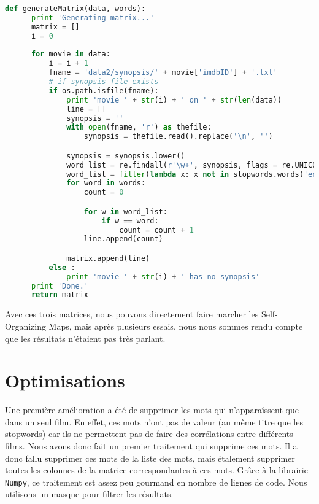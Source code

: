 \begin{lstlisting}[language=python]
  def generateMatrix(data, words):
      print 'Generating matrix...'
      matrix = []
      i = 0
    
      for movie in data:
          i = i + 1
          fname = 'data2/synopsis/' + movie['imdbID'] + '.txt'
          # if synopsis file exists
          if os.path.isfile(fname):
              print 'movie ' + str(i) + ' on ' + str(len(data))
              line = []
              synopsis = ''
              with open(fname, 'r') as thefile:
                  synopsis = thefile.read().replace('\n', '')

              synopsis = synopsis.lower()
              word_list = re.findall(r'\w+', synopsis, flags = re.UNICODE | re.LOCALE) 
              word_list = filter(lambda x: x not in stopwords.words('english'), word_list)
              for word in words:
                  count = 0

                  for w in word_list:
                      if w == word:
                          count = count + 1
                  line.append(count)

              matrix.append(line)
          else :
              print 'movie ' + str(i) + ' has no synopsis'
      print 'Done.'
      return matrix
\end{lstlisting}

Avec ces trois matrices, nous pouvons directement faire marcher les Self-Organizing Maps, mais après plusieurs essais, nous nous sommes rendu compte que les résultats n'étaient pas très parlant.

\section{Optimisations}

Une première amélioration a été de supprimer les mots qui n'apparaîssent que dans un seul film. En effet, ces mots n'ont pas de valeur (au même titre que les stopwords) car ils ne permettent pas de faire des corrélations entre différents films. Nous avons donc fait un premier traitement qui supprime ces mots. Il a donc fallu supprimer ces mots de la liste des mots, mais étalement supprimer toutes les colonnes de la matrice correspondantes à ces mots. Grâce à la librairie \texttt{Numpy}, ce traitement est assez peu gourmand en nombre de lignes de code. Nous utilisons un masque pour filtrer les résultats. \\


